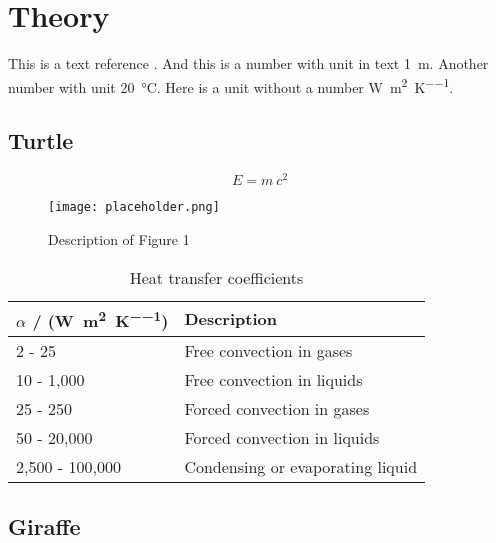 \chapter{Theory}\label{chap:theory}

This is a text reference \cite{Klement.2021}. And this is a number with unit in text \SI{1}{\metre}. Another number with unit \SI{20}{\celsius}. Here is a unit without a number \si{\watt\per\square\metre\per\kelvin}.


\section{Turtle}\label{sec:turtle}
\lipsum[2-4]

\begin{equation}
  E = m\ c^2
  \label{eq:equation1}
\end{equation}

\begin{figure}[h]
  \centering
  \texttt{[image: placeholder.png]}
  \caption{Description of Figure 1}\label{fig:figure1}
\end{figure}

\begin{table}[h]
  \centering
  \begin{tabular}[]{l l}
    \toprule
    $\alpha$ / (\si{\watt\per\square\metre\per\kelvin}) & Description                      \\
    \midrule
    2 - 25                                              & Free convection in gases         \\
    10 - 1,000                                          & Free convection in liquids       \\
    25 - 250                                            & Forced convection in gases       \\
    50 - 20,000                                         & Forced convection in liquids     \\
    2,500 - 100,000                                     & Condensing or evaporating liquid \\
    \bottomrule
  \end{tabular}
  \caption{Heat transfer coefficients\cite{VDIGesellschaftVerfahrenstechnikundChemieingenieurwesen.2013}}\label{tab:alphaValues}
\end{table}

\section{Giraffe}\label{subsec:Giraffe}
\lipsum[2-4]

